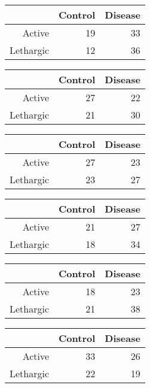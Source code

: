 \documentclass{article}\usepackage{graphicx, color}
\begin{document}
\begin{multicols}{3}
\bigskip
\begin{tabular}{rrr}
  \hline
 & Control & Disease \\ 
  \hline
Active &  19 &  33 \\ 
  Lethargic &  12 &  36 \\ 
   \hline
\end{tabular}


\bigskip
\begin{tabular}{rrr}
  \hline
 & Control & Disease \\ 
  \hline
Active &  27 &  22 \\ 
  Lethargic &  21 &  30 \\ 
   \hline
\end{tabular}


\bigskip
\begin{tabular}{rrr}
  \hline
 & Control & Disease \\ 
  \hline
Active &  27 &  23 \\ 
  Lethargic &  23 &  27 \\ 
   \hline
\end{tabular}


\bigskip
\begin{tabular}{rrr}
  \hline
 & Control & Disease \\ 
  \hline
Active &  21 &  27 \\ 
  Lethargic &  18 &  34 \\ 
   \hline
\end{tabular}


\bigskip
\begin{tabular}{rrr}
  \hline
 & Control & Disease \\ 
  \hline
Active &  18 &  23 \\ 
  Lethargic &  21 &  38 \\ 
   \hline
\end{tabular}


\bigskip
\begin{tabular}{rrr}
  \hline
 & Control & Disease \\ 
  \hline
Active &  33 &  26 \\ 
  Lethargic &  22 &  19 \\ 
   \hline
\end{tabular}



\end{multicols}
\end{document}
